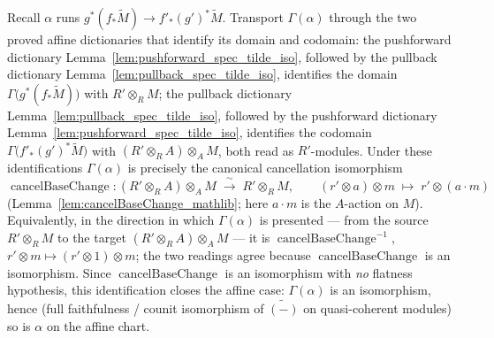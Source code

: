 \begin{lemma}
  Recall \(\alpha\) runs
  \(g^*(f_*\widetilde{M}) \to f'_*(g')^*\widetilde{M}\). Transport \(\Gamma(\alpha)\)
  through the two proved affine dictionaries that identify its domain and codomain: the
  pushforward dictionary Lemma~\ref{lem:pushforward_spec_tilde_iso}, followed by the
  pullback dictionary Lemma~\ref{lem:pullback_spec_tilde_iso}, identifies the domain
  \(\Gamma\bigl(g^*(f_*\widetilde{M})\bigr)\) with \(R' \otimes_R M\); the pullback
  dictionary Lemma~\ref{lem:pullback_spec_tilde_iso}, followed by the pushforward
  dictionary Lemma~\ref{lem:pushforward_spec_tilde_iso}, identifies the codomain
  \(\Gamma\bigl(f'_*(g')^*\widetilde{M}\bigr)\) with \((R' \otimes_R A) \otimes_A M\),
  both read as \(R'\)-modules. Under these identifications \(\Gamma(\alpha)\) is
  precisely the canonical cancellation isomorphism
  \[
    \operatorname{cancelBaseChange} :
    (R' \otimes_R A) \otimes_A M \;\xrightarrow{\ \sim\ }\; R' \otimes_R M,
    \qquad (r' \otimes a) \otimes m \;\mapsto\; r' \otimes (a \cdot m)
  \]
  (Lemma~\ref{lem:cancelBaseChange_mathlib}; here \(a \cdot m\) is the \(A\)-action on \(M\)). Equivalently, in the direction in which
  \(\Gamma(\alpha)\) is presented — from the source \(R' \otimes_R M\) to the target
  \((R' \otimes_R A) \otimes_A M\) — it is \(\operatorname{cancelBaseChange}^{-1}\),
  \(r' \otimes m \mapsto (r' \otimes 1) \otimes m\); the two readings agree because
  \(\operatorname{cancelBaseChange}\) is an isomorphism. Since
  \(\operatorname{cancelBaseChange}\) is an isomorphism with \emph{no} flatness
  hypothesis, this identification closes the affine case: \(\Gamma(\alpha)\) is an
  isomorphism, hence (full faithfulness / counit isomorphism of \(\widetilde{(-)}\) on
  quasi-coherent modules) so is \(\alpha\) on the affine chart.

\end{lemma}

